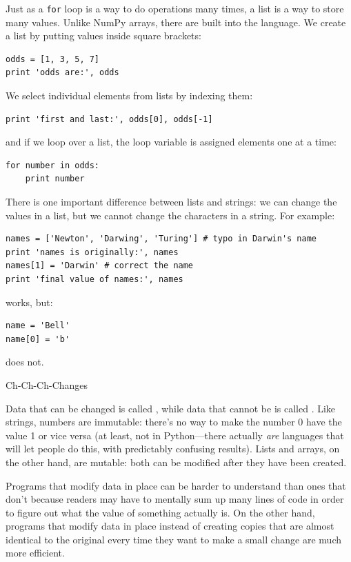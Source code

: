 \documentclass{book}
\begin{document}
Just as a \texttt{for} loop is a way to do operations many times, a list
is a way to store many values. Unlike NumPy arrays, there are built into
the language. We create a list by putting values inside square brackets:

\begin{verbatim}
odds = [1, 3, 5, 7]
print 'odds are:', odds
\end{verbatim}

We select individual elements from lists by indexing them:

\begin{verbatim}
print 'first and last:', odds[0], odds[-1]
\end{verbatim}

and if we loop over a list, the loop variable is assigned elements one
at a time:

\begin{verbatim}
for number in odds:
    print number
\end{verbatim}

There is one important difference between lists and strings: we can
change the values in a list, but we cannot change the characters in a
string. For example:

\begin{verbatim}
names = ['Newton', 'Darwing', 'Turing'] # typo in Darwin's name
print 'names is originally:', names
names[1] = 'Darwin' # correct the name
print 'final value of names:', names
\end{verbatim}

works, but:

\begin{verbatim}
name = 'Bell'
name[0] = 'b'
\end{verbatim}

does not.

\begin{swcbox}{Ch-Ch-Ch-Changes}

Data that can be changed is called , while
data that cannot be is called . Like
strings, numbers are immutable: there's no way to make the number 0 have
the value 1 or vice versa (at least, not in Python---there actually
\emph{are} languages that will let people do this, with predictably
confusing results). Lists and arrays, on the other hand, are mutable:
both can be modified after they have been created.

Programs that modify data in place can be harder to understand than ones
that don't because readers may have to mentally sum up many lines of
code in order to figure out what the value of something actually is. On
the other hand, programs that modify data in place instead of creating
copies that are almost identical to the original every time they want to
make a small change are much more efficient.

\end{swcbox}
\end{document}
